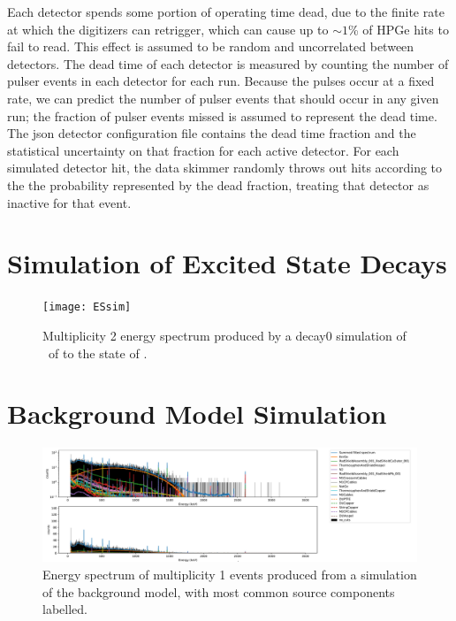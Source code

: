 \documentclass[/main.tex]{subfiles}
\begin{document}
Each detector spends some portion of operating time dead, due to the finite rate at which the digitizers can retrigger, which can cause up to $\sim1$\% of HPGe hits to fail to read.
This effect is assumed to be random and uncorrelated between detectors.
The dead time of each detector is measured by counting the number of pulser events in each detector for each run.
Because the pulses occur at a fixed rate, we can predict the number of pulser events that should occur in any given run; the fraction of pulser events missed is assumed to represent the dead time.
The json detector configuration file contains the dead time fraction and the statistical uncertainty on that fraction for each active detector.
For each simulated detector hit, the data skimmer randomly throws out hits according to the the probability represented by the dead fraction, treating that detector as inactive for that event.

\section{Simulation of Excited State Decays}

\begin{figure}
  \centering
  \texttt{[image: ESsim]}
  \caption[Simulation of multiplicty 2 events from \tnbb\ to ]{
    Multiplicity 2 energy spectrum produced by a decay0 simulation of \tnbb\ of  to the  state of .
  }
\end{figure}

\section{Background Model Simulation}

\begin{figure}
  \centering
  \includegraphics[width=1\linewidth]{BGsim1D}
  \caption[Simulation of multiplicty 1 events from the background model]{
    Energy spectrum of multiplicity 1 events produced from a simulation of the background model, with most common source components labelled.
  }
\end{figure}
\end{document}
